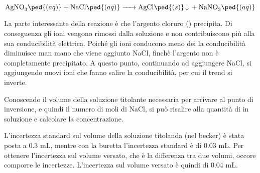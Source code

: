 \begin{equation*}
        \ce{AgNO3\ped{(aq)} + NaCl\ped{(aq)} -> AgCl\ped{(s)} v + NaNO3\ped{(aq)}}
\end{equation*}

La parte interessante della reazione è che l'argento cloruro () precipita. Di conseguenza gli ioni 
vengono rimossi dalla soluzione e non contribuiscono più alla sua conducibilità elettrica.
Poiché gli ioni  conducono meno dei  la conducibilità diminuisce man mano che viene aggiunto NaCl,
finchè l'argento non è completamente precipitato. A questo punto, continuando ad aggiungere NaCl, si aggiungendo nuovi ioni  che fanno salire la conducibilità,
per cui il trend si inverte.

Conoscendo il volume della soluzione titolante necessaria per arrivare al punto di inversione, e quindi il numero di moli
di NaCl, si può risalire alla quantità di  in soluzione e calcolare la concentrazione.

L'incertezza standard sul volume della soluzione titolanda (nel becker) è stata posta a 0.3 mL, mentre con la
buretta l'incertezza standard è di 0.03 mL. Per ottenere l'incertezza sul volume versato, che è la differenza tra due volumi,
occore comporre le incertezze. L'incertezza sul volume versato è quindi di 0.04 mL.
